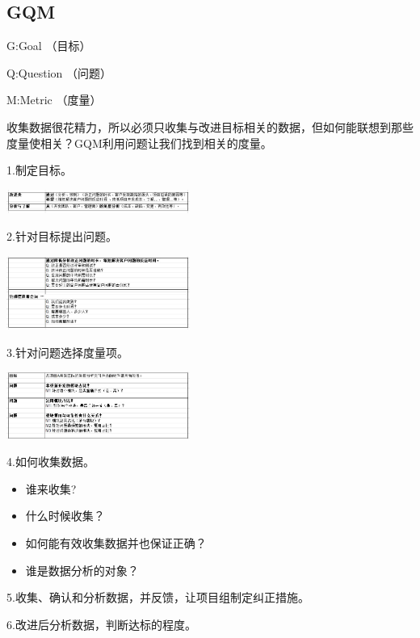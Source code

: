 \hypertarget{gqm}{%
\subsection{GQM}\label{gqm}}

\begin{description}
\tightlist
\item[]
G:Goal （目标）

Q:Question （问题）

M:Metric （度量）
\end{description}

收集数据很花精力，所以必须只收集与改进目标相关的数据，但如何能联想到那些度量使相关？GQM利用问题让我们找到相关的度量。

1.制定目标。

\includegraphics[width=6cm]{Gqm1Screenshot_2023-11-01_113815.jpg}

2.针对目标提出问题。

\includegraphics[width=6cm]{Gqm2Screenshot_2023-11-01_114014.jpg}

3.针对问题选择度量项。

\includegraphics[width=6cm]{Gqm3Screenshot_2023-11-01_114048.jpg}

4.如何收集数据。

\begin{itemize}
\tightlist
\item
  谁来收集?
\item
  什么时候收集？
\item
  如何能有效收集数据并也保证正确？
\item
  谁是数据分析的对象？
\end{itemize}

5.收集、确认和分析数据，并反馈，让项目组制定纠正措施。

6.改进后分析数据，判断达标的程度。

